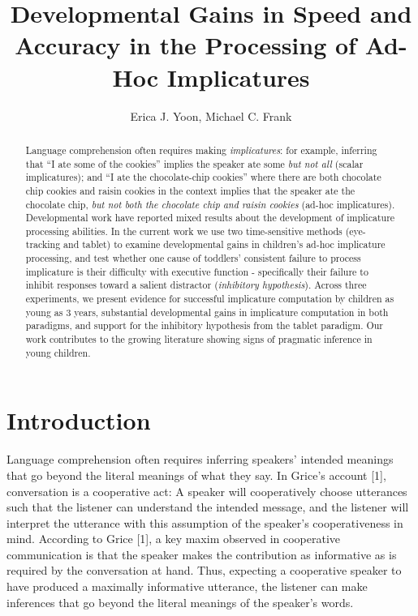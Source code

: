 \documentclass{rsos}
\begin{document}
\title{Developmental Gains in Speed and Accuracy in the Processing of Ad-Hoc
Implicatures}
\author{Erica J. Yoon, Michael C. Frank}
\address{Department of Psychology, Stanford University}
\subject{Psychology}

\begin{abstract}
Language comprehension often requires making \emph{implicatures}: for
example, inferring that ``I ate some of the cookies'' implies the
speaker ate some \emph{but not all} (scalar implicatures); and ``I ate
the chocolate-chip cookies'' where there are both chocolate chip cookies
and raisin cookies in the context implies that the speaker ate the
chocolate chip, \emph{but not both the chocolate chip and raisin
cookies} (ad-hoc implicatures). Developmental work have reported mixed
results about the development of implicature processing abilities. In
the current work we use two time-sensitive methods (eye-tracking and
tablet) to examine developmental gains in children's ad-hoc implicature
processing, and test whether one cause of toddlers' consistent failure
to process implicature is their difficulty with executive function -
specifically their failure to inhibit responses toward a salient
distractor (\emph{inhibitory hypothesis}). Across three experiments, we
present evidence for successful implicature computation by children as
young as 3 years, substantial developmental gains in implicature
computation in both paradigms, and support for the inhibitory hypothesis
from the tablet paradigm. Our work contributes to the growing literature
showing signs of pragmatic inference in young children.
\end{abstract}


\maketitle
\section{Introduction}\label{introduction}

Language comprehension often requires inferring speakers' intended
meanings that go beyond the literal meanings of what they say. In
Grice's account {[}1{]}, conversation is a cooperative act: A speaker will
cooperatively choose utterances such that the listener can understand
the intended message, and the listener will interpret the utterance with
this assumption of the speaker's cooperativeness in mind. According to
Grice {[}1{]}, a key maxim observed in cooperative communication is that the
speaker makes the contribution as informative as is required by the
conversation at hand. Thus, expecting a cooperative speaker to have
produced a maximally informative utterance, the listener can make
inferences that go beyond the literal meanings of the speaker's words.
\end{document}
